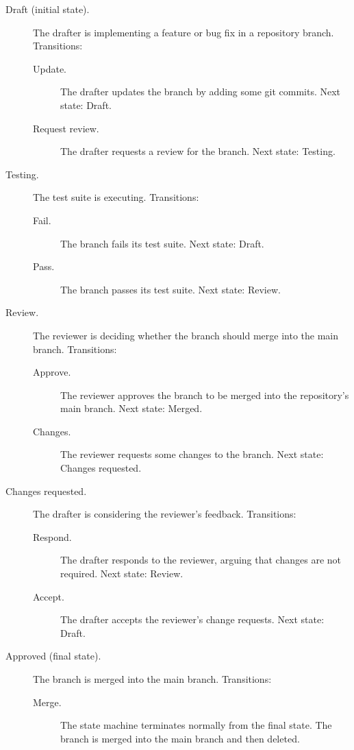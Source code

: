 \documentclass[../midgard.tex]{subfiles}
\begin{document}
\begin{description}
    \item[Draft (initial state).] The drafter is implementing a feature or bug fix in a repository branch. Transitions:
        \begin{description}
            \item[Update.] The drafter updates the branch by adding some git commits. Next state: Draft.
            \item[Request review.] The drafter requests a review for the branch. Next state: Testing.
        \end{description}
    \item[Testing.] The test suite is executing. Transitions:
        \begin{description}
            \item[Fail.] The branch fails its test suite. Next state: Draft.
            \item[Pass.] The branch passes its test suite. Next state: Review.
        \end{description}
    \item[Review.] The reviewer is deciding whether the branch should merge into the main branch. Transitions:
        \begin{description}
            \item[Approve.] The reviewer approves the branch to be merged into the repository's main branch. Next state: Merged.
            \item[Changes.] The reviewer requests some changes to the branch. Next state: Changes requested.
        \end{description}
    \item[Changes requested.] The drafter is considering the reviewer's feedback. Transitions:
        \begin{description}
            \item[Respond.] The drafter responds to the reviewer, arguing that changes are not required. Next state: Review.
            \item[Accept.] The drafter accepts the reviewer's change requests. Next state: Draft.
        \end{description}
    \item[Approved (final state).] The branch is merged into the main branch. Transitions:
        \begin{description}
            \item[Merge.] The state machine terminates normally from the final state. The branch is merged into the main branch and then deleted.
        \end{description}
\end{description}
\end{document}
